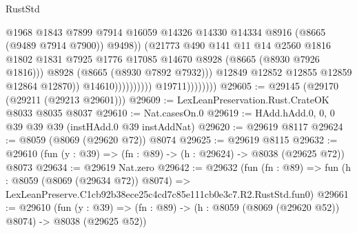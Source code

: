 \begin{lexlean}{RustStd}
\begin{coremodule}
                                                  @1968
                                                  @1843
                                                  @7899
                                                  @7914
                                                  @16059
                                                  @14326
                                                  @14330
                                                  @14334
                                                  @8916
                                                  (@8665 (@9489 @7914 @7900))
                                                  @9498))
                                              (@21773
                                                @490
                                                @141
                                                @11
                                                @14
                                                @2560
                                                @1816
                                                @1802
                                                @1831
                                                @7925
                                                @1776
                                                @17085
                                                @14670
                                                @8928
                                                (@8665 (@8930 @7926 @1816)))
                                              @8928
                                              (@8665 (@8930 @7892 @7932)))
                                            @12849
                                            @12852
                                            @12855
                                            @12859
                                            @12864
                                            @12870))
                                        @14610))))))))))
                    @19711))))))))
@29605 := @29145 (@29170 (@29211 (@29213 @29601)))
@29609 := LexLeanPreservation.Rust.CrateOK @8033 @8035 @8037
@29610 := Nat.casesOn.{0}
@29619 := HAdd.hAdd.{0, 0, 0} @39 @39 @39 (instHAdd.{0} @39 instAddNat)
@29620 := @29619 @8117
@29624 := @8059 (@8069 (@29620 @72)) @8074
@29625 := @29619 @8115
@29632 := @29610 (fun (y : @39) => (fn : @89) -> (h : @29624) -> @8038 (@29625 @72)) @8073
@29634 := @29619 Nat.zero
@29642 := @29632
    (fun (fn : @89) =>
    fun (h : @8059 (@8069 (@29634 @72)) @8074) =>
    LexLeanPreserve.C1cb92b38ece25c4cd7c85e111cb0e3c7.R2.RustStd.fun0)
@29661 := @29610
    (fun (y : @39) => (fn : @89) -> (h : @8059 (@8069 (@29620 @52)) @8074) -> @8038 (@29625 @52))

\end{coremodule}
\end{lexlean}
